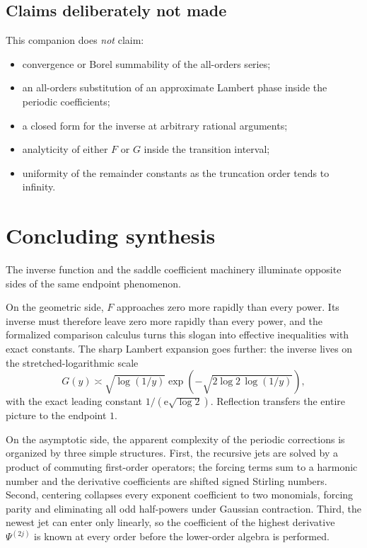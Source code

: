\documentclass[11pt,oneside]{article}
\theoremstyle{definition}
\theoremstyle{remark}
\newcommand{\e}{\mathrm e}
\newcommand{\InvF}{G}
\begin{document}
\subsection{Claims deliberately not made}

This companion does \emph{not} claim:
\begin{itemize}
\item convergence or Borel summability of the all-orders series;
\item an all-orders substitution of an approximate Lambert phase inside
the periodic coefficients;
\item a closed form for the inverse at arbitrary rational arguments;
\item analyticity of either $F$ or $\InvF$ inside the transition interval;
\item uniformity of the remainder constants as the truncation order tends
to infinity.
\end{itemize}

\section{Concluding synthesis}

The inverse function and the saddle coefficient machinery illuminate
opposite sides of the same endpoint phenomenon.

On the geometric side, $F$ approaches zero more rapidly than every
power.  Its inverse must therefore leave zero more rapidly than every
power, and the formalized comparison calculus turns this slogan into
effective inequalities with exact constants.  The sharp Lambert
expansion goes further: the inverse lives on the
stretched-logarithmic scale
\[
 \InvF(y)\asymp
 \sqrt{\log(1/y)}
 \exp\!\left(-\sqrt{2\log2\,\log(1/y)}\right),
\]
with the exact leading constant $1/(\e\sqrt{\log2})$.  Reflection transfers
the entire picture to the endpoint $1$.

On the asymptotic side, the apparent complexity of the periodic
corrections is organized by three simple structures.  First, the
recursive jets are solved by a product of commuting first-order
operators; the forcing terms sum to a harmonic number and the derivative
coefficients are shifted signed Stirling numbers.  Second, centering
collapses every exponent coefficient to two monomials, forcing parity and
eliminating all odd half-powers under Gaussian contraction.  Third, the
newest jet can enter only linearly, so the coefficient of the highest
derivative $\Psi^{(2j)}$ is known at every order before the lower-order
algebra is performed.
\end{document}
